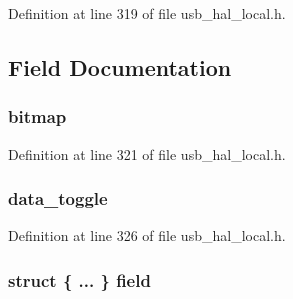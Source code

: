 Definition at line 319 of file usb\+\_\+hal\+\_\+local.\+h.



\subsection{Field Documentation}
\hypertarget{union_p_i_p_e___f_l_a_g_s_aeaf0bd08f496808a64c5beb062fb535e}{}
\subsubsection[{bitmap}]{ bitmap}\label{union_p_i_p_e___f_l_a_g_s_aeaf0bd08f496808a64c5beb062fb535e}


Definition at line 321 of file usb\+\_\+hal\+\_\+local.\+h.

\hypertarget{union_p_i_p_e___f_l_a_g_s_a7afb68620627fc9e2c68713ce4676a87}{}
\subsubsection[{data\+\_\+toggle}]{ data\+\_\+toggle}\label{union_p_i_p_e___f_l_a_g_s_a7afb68620627fc9e2c68713ce4676a87}


Definition at line 326 of file usb\+\_\+hal\+\_\+local.\+h.

\hypertarget{union_p_i_p_e___f_l_a_g_s_afbefd008fb88e2e988d0d741ecf947b4}{}
\subsubsection[{field}]{\setlength{\rightskip}{0pt plus 5cm}struct \{ ... \}  field}\label{union_p_i_p_e___f_l_a_g_s_afbefd008fb88e2e988d0d741ecf947b4}
\hypertarget{union_p_i_p_e___f_l_a_g_s_a90625cae626baec3b0e8256b52dcc254}{}
